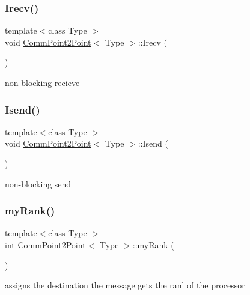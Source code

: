 \subsubsection{\texorpdfstring{Irecv()}{Irecv()}}
{\footnotesize\ttfamily template$<$class Type $>$ \\
void \mbox{\hyperlink{classCommPoint2Point}{Comm\+Point2\+Point}}$<$ Type $>$\+::Irecv (\begin{DoxyParamCaption}{ }\end{DoxyParamCaption})}

non-\/blocking recieve \mbox{\label{classCommPoint2Point_a6415fa1d951388ab158d441539337ed0}} 
\subsubsection{\texorpdfstring{Isend()}{Isend()}}
{\footnotesize\ttfamily template$<$class Type $>$ \\
void \mbox{\hyperlink{classCommPoint2Point}{Comm\+Point2\+Point}}$<$ Type $>$\+::Isend (\begin{DoxyParamCaption}{ }\end{DoxyParamCaption})}

non-\/blocking send \mbox{\label{classCommPoint2Point_aea7be5ce3b1dcd98c6d02c165be9867c}} 
\subsubsection{\texorpdfstring{my\+Rank()}{myRank()}}
{\footnotesize\ttfamily template$<$class Type $>$ \\
int \mbox{\hyperlink{classCommPoint2Point}{Comm\+Point2\+Point}}$<$ Type $>$\+::my\+Rank (\begin{DoxyParamCaption}{ }\end{DoxyParamCaption})}

assigns the destination the message gets the ranl of the processor \mbox{\label{classCommPoint2Point_a98dd7b3bbe9cb5b603d9bb29371eb7db}} 
